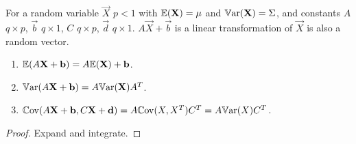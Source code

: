 \documentclass[10pt, a4paper]{article}
\begin{document}
\begin{proposition}
    For a random variable $\vec{X}$ $p < 1$ with $\mathbb{E}(\mathbf{X}) = \mathbf{\mu}$ and $\mathbb{V}\mathrm{ar}(\mathbf{X}) = \Sigma$,
    and constants $A$ $q \times p$,
    $\vec{b}$ $q \times 1$,
    $C$ $q \times p$,
    $\vec{d}$ $q \times 1$.
    $A\vec{X} + \vec{b}$ is a linear transformation of $\vec{X}$ is also a random vector.
    \begin{enumerate}[label = (\roman*)]
        \item $\mathbb{E}(A\mathbf{X} + \mathbf{b}) = A\mathbb{E}(\mathbf{X}) + \mathbf{b}$.
    
        \item $\mathbb{V}\mathrm{ar}(A\mathbf{X} + \mathbf{b}) = A\mathbb{V}\mathrm{ar}(\mathbf{X})A ^ T$.
    
        \item $\mathbb{C}\mathrm{ov}(A\mathbf{X} + \mathbf{b}, C\mathbf{X} + \mathbf{d}) = A\mathbb{C}\mathrm{ov}(X, X ^ T)C ^ T = A\mathbb{V}\mathrm{ar}(X)C ^ T$.
    \end{enumerate}

    \begin{proof}
        Expand and integrate.
    \end{proof}
\end{proposition}
\end{document}
